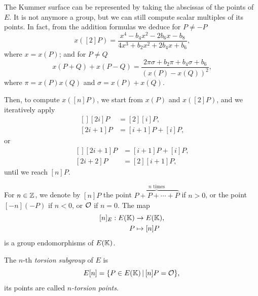 \begin{remark}
  The Kummer surface can be represented by taking the abscissas of the
  points of $E$. It is not anymore a group, but we can still compute
  scalar multiples of its points. In fact, from the addition formulas
  we deduce for $P\ne-P$
  \begin{equation}
    \label{eq:128}
    x([2]P) = \frac{x^4-b_4x^2-2b_6x-b_8}{4x^3+b_2x^2+2b_4x+b_6}
    \text{,}
  \end{equation}
  where $x=x(P)$; and for $P\ne Q$
  \begin{equation}
    \label{eq:129}
    x(P+Q) + x(P-Q) =
    \frac{2\pi\sigma + b_2\pi + b_4\sigma + b_6}{(x(P)-x(Q))^2}
    \text{,}
  \end{equation}
  where $\pi=x(P)x(Q)$ and $\sigma=x(P)+x(Q)$. 

  Then, to compute $x([n]P)$, we start from $x(P)$ and $x([2]P)$, and
  we iteratively apply
  \begin{equation}
    \label{eq:130}
    \begin{aligned}[]
      [2i]P   &= [2][i]P\text{,}\\
      [2i+1]P &= [i+1]P + [i]P\text{,}
    \end{aligned}
  \end{equation}  
  or
  \begin{equation}
    \label{eq:131}
    \begin{aligned}[]
      [2i+1]P &= [i+1]P + [i]P\text{,}\\
      [2i+2]P &= [2][i+1]P\text{,}
    \end{aligned}
  \end{equation}
  until we reach $[n]P$.
\end{remark}

For $n\in\mathbb{Z}$, we denote by $[n]P$ the point%
 $\overbrace{P+P+\cdots+P}^{n\text{ times}}$ if $n>0$, or the
point $[-n](-P)$ if $n<0$, or $\mathcal{O}$ if $n=0$. The map
\begin{equation}
  \label{eq:122}
  \begin{aligned}[]
    [n]_E : E(\K) &\ra E(\K)\text{,}\\
    P &\mapsto [n]P
  \end{aligned}
\end{equation}
is a group endomorphisms of $E(\mathbb{K})$. 

\begin{definition}
  The $n$-th \emph{torsion subgroup} of $E$ is
  \begin{equation}
    \label{eq:123}
    E[n] = \{P\in E(\mathbb{K}) \,|\, [n]P=\mathcal{O}\}
    \text{,}
  \end{equation}
  its points are called%
  \emph{$n$-torsion
    points}.
\end{definition}

